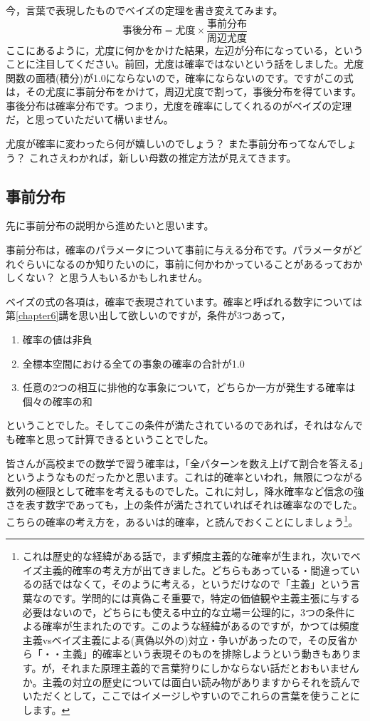 \documentclass{ltjsarticle}
\begin{document}
今，言葉で表現したものでベイズの定理を書き変えてみます。
\[ \mbox{事後分布} = \mbox{尤度} \times \frac{事前分布}{周辺尤度}\]
ここにあるように，尤度に何かをかけた結果，左辺が分布になっている，ということに注目してください。前回，尤度は確率ではないという話をしました。尤度関数の面積(積分)が1.0にならないので，確率にならないのです。ですがこの式は，その尤度に事前分布をかけて，周辺尤度で割って，事後分布を得ています。事後分布は確率分布です。つまり，尤度を確率にしてくれるのがベイズの定理だ，と思っていただいて構いません。

尤度が確率に変わったら何が嬉しいのでしょう？ また事前分布ってなんでしょう？ これさえわかれば，新しい母数の推定方法が見えてきます。

\subsection{事前分布}
先に事前分布の説明から進めたいと思います。

事前分布は，確率のパラメータについて事前に与える分布です。パラメータがどれぐらいになるのか知りたいのに，事前に何かわかっていることがあるっておかしくない？ と思う人もいるかもしれません。

ベイズの式の各項は，確率で表現されています。確率と呼ばれる数字については第\ref{chapter6}講を思い出して欲しいのですが，条件が3つあって，
\begin{enumerate}
    \item 確率の値は非負
    \item 全標本空間における全ての事象の確率の合計が1.0
    \item 任意の2つの相互に排他的な事象について，どちらか一方が発生する確率は個々の確率の和
\end{enumerate}
ということでした。そしてこの条件が満たされているのであれば，それはなんでも確率と思って計算できるということでした。

皆さんが高校までの数学で習う確率は，「全パターンを数え上げて割合を答える」というようなものだったかと思います。これは的確率といわれ，無限につながる数列の極限として確率を考えるものでした。これに対し，降水確率など信念の強さを表す数字であっても，上の条件が満たされていればそれは確率なのでした。こちらの確率の考え方を，あるいは的確率，と読んでおくことにしましょう\footnote{これは歴史的な経緯がある話で，まず頻度主義的な確率が生まれ，次いでベイズ主義的確率の考え方が出てきました。どちらもあっている・間違っているの話ではなくて，そのように考える，というだけなので「主義」という言葉なのです。学問的には真偽こそ重要で，特定の価値観や主義主張に与する必要はないので，どちらにも使える中立的な立場＝公理的に，3つの条件による確率が生まれたのです。このような経緯があるのですが，かつては頻度主義vsベイズ主義による(真偽以外の)対立・争いがあったので，その反省から「・・主義」的確率という表現そのものを排除しようという動きもあります。が，それまた原理主義的で言葉狩りにしかならない話だとおもいませんか。主義の対立の歴史については面白い読み物がありますからそれ\citep{mcgrayne2011theory}を読んでいただくとして，ここではイメージしやすいのでこれらの言葉を使うことにします。}。
\end{document}
